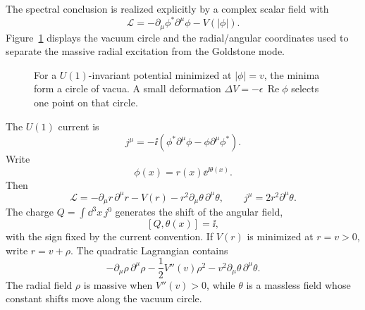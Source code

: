 The spectral conclusion is realized explicitly by a complex scalar field with
\[
  \mathcal L
  =
  -\partial_\mu\phi^*\partial^\mu\phi
  -V(|\phi|).
\]
Figure~\ref{fig:u1-goldstone-vacuum-circle} displays the vacuum circle and the
radial/angular coordinates used to separate the massive radial excitation from
the Goldstone mode.
\begin{figure}[H]
  \centering
  \caption{For a \(U(1)\)-invariant potential minimized at \(|\phi|=v\), the
  minima form a circle of vacua.  A small deformation
  \(\Delta V=-\epsilon\,\operatorname{Re}\phi\) selects one point on that
  circle.}
  \label{fig:u1-goldstone-vacuum-circle}
\end{figure}
The \(U(1)\) current is
\[
  j^\mu
  =
  -\ii(\phi^*\partial^\mu\phi-\phi\partial^\mu\phi^*).
\]
Write
\[
  \phi(x)=r(x)\ee^{\ii\theta(x)}.
\]
Then
\[
  \mathcal L
  =
  -\partial_\mu r\,\partial^\mu r
  -V(r)
  -r^2\partial_\mu\theta\,\partial^\mu\theta,
  \qquad
  j^\mu=2r^2\partial^\mu\theta .
\]
The charge \(Q=\int\dd^3x\,j^0\) generates the shift of the angular field,
\[
  [Q,\theta(x)]=\ii ,
\]
with the sign fixed by the current convention.  If \(V(r)\) is minimized at
\(r=v>0\), write \(r=v+\rho\).  The quadratic Lagrangian contains
\[
  -\partial_\mu\rho\,\partial^\mu\rho
  -\frac12V''(v)\rho^2
  -v^2\partial_\mu\theta\,\partial^\mu\theta .
\]
The radial field \(\rho\) is massive when \(V''(v)>0\), while \(\theta\) is a
massless field whose constant shifts move along the vacuum circle.

